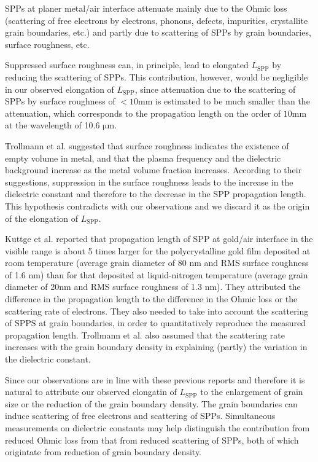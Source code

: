 \documentclass[aip,apl,reprint]{revtex4-1}
\begin{document}
SPPs at planer metal/air interface attenuate mainly due to the Ohmic loss  (scattering of free electrons by electrons, phonons, defects, impurities, crystallite grain boundaries, etc.) and partly due to scattering of SPPs by grain boundaries, surface roughness, etc\cite{Kuttge, Lee}. 

Suppressed surface roughness can, in principle, lead to elongated $L_{\mathrm{SPP}}$ by reducing the scattering of SPPs. This contribution, however, would be negligible in our observed elongation of $L_{\mathrm{SPP}}$, since attenuation due to the scattering of SPPs by surface roughness of $<10 \mathrm{mm}$ is estimated to be much smaller than the attenuation, which corresponds to the propagation length on the order of $10 \mathrm{mm}$ at the wavelength of 10.6 $\mathrm{\mu m}$.\cite{Shiba, Kuttge, Mills} 

Trollmann et al.\cite{Trollmann} suggested that surface roughness indicates the existence of empty volume in metal, and that the plasma frequency and the dielectric background increase as the metal volume fraction increases. According to their suggestions, suppression in the surface roughness leads to the increase in the dielectric constant and therefore to the decrease in the SPP propagation length. This hypothesis contradicts with our observations and we discard it as the origin of the elongation of $L_{\mathrm{SPP}}$.

Kuttge et al.\cite{Kuttge} reported that propagation length of SPP at gold/air interface in the visible range is about 5 times larger for the polycrystalline gold film deposited at room temperature (average grain diameter of 80 nm and RMS surface roughness of 1.6 nm) than for that deposited at liquid-nitrogen temperature (average grain diameter of 20nm and RMS surface roughness of 1.3 nm). They attributed the difference in the propagation length to the difference in the Ohmic loss or the scattering rate of electrons. They also needed to take into account the scattering of SPPS at grain boundaries, in order to quantitatively reproduce the measured propagation length.  Trollmann et al.\cite{Trollmann} also assumed that the scattering rate increases with the grain boundary density in explaining (partly) the variation in the dielectric constant. 

Since our observations are in line with these previous reports and therefore it is natural to attribute our observed elongatin of $L_{\mathrm{SPP}}$ to the enlargement of grain size or the reduction of the grain boundary density. The grain boundaries can induce scattering of free electrons\cite{Kuttge, Yang, Trollmann} and scattering of SPPs\cite{Kuttge, Lee}. Simultaneous measurements on dielectric constants may help distinguish the contribution from reduced Ohmic loss from that from reduced scattering of SPPs, both of which origintate from  reduction of grain boundary density.\color{black}
\end{document}

